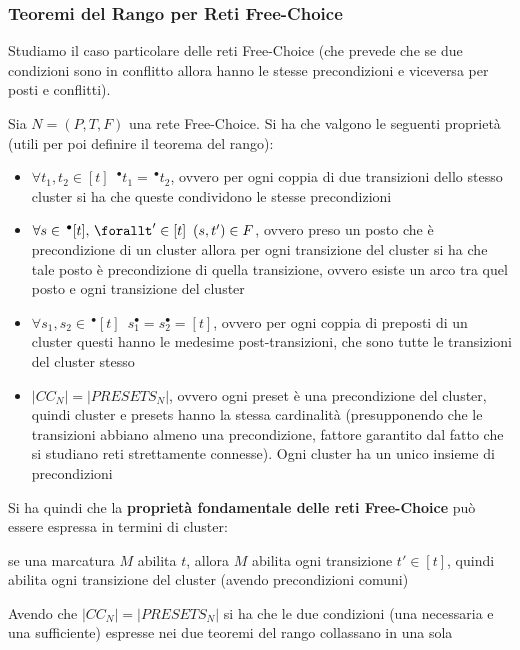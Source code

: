\documentclass[a4paper,12pt, oneside]{book}
\begin{document}
\subsubsection{Teoremi del Rango per Reti Free-Choice}
Studiamo il caso particolare delle reti Free-Choice (che prevede che se due
condizioni sono in conflitto allora hanno le stesse precondizioni e viceversa
per posti e conflitti).\\
\begin{definizione}
  Sia $N = (P, T , F )$ una rete Free-Choice. Si ha che
  valgono le seguenti proprietà (utili per poi definire il teorema del rango):
  \begin{itemize}
    \item $\forall t_1,t_2\in [t]\,\,\,^\bullet t_1=\,^\bullet t_2$, ovvero
    per ogni coppia di due transizioni dello stesso cluster si ha che queste
    condividono le stesse precondizioni
    \item $\forall s\in \,^\bullet [t],\,\forallt'\in [t]\,\,\,(s,t')\in F$,
    ovvero preso un posto che è precondizione di un cluster allora per ogni
    transizione del cluster si ha che tale posto è precondizione di quella
    transizione, ovvero esiste un arco tra quel posto e ogni transizione del
    cluster
    \item $\forall s_1,s_2\in \,^\bullet[t]\,\,\,s_1^\bullet=s_2^\bullet=[t]$,
    ovvero per ogni coppia di preposti di un cluster questi hanno le medesime
    post-transizioni, che sono tutte le transizioni del cluster stesso
    \item $|CC_N|=|PRESETS_N|$, ovvero ogni preset è una precondizione del
    cluster, quindi cluster e presets hanno la stessa cardinalità (presupponendo
    che le transizioni abbiano almeno una precondizione, fattore garantito dal
    fatto che si studiano reti strettamente connesse). Ogni cluster ha un unico
    insieme di precondizioni
  \end{itemize}
  Si ha quindi che la \textbf{proprietà fondamentale delle reti Free-Choice} può
  essere espressa in termini di cluster:
  \begin{center}
    se una marcatura $M$ abilita $t$, allora $M$ abilita ogni transizione $t'
    \in [t]$, quindi abilita ogni transizione del cluster (avendo precondizioni
    comuni) 
  \end{center}
\end{definizione}
Avendo che $|CC_N|=|PRESETS_N|$ si ha che le due condizioni (una necessaria e
una sufficiente) espresse nei due teoremi del rango collassano in una sola
\end{document}
